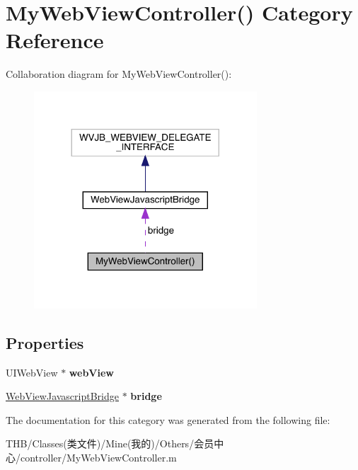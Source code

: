 \hypertarget{category_my_web_view_controller_07_08}{}\section{My\+Web\+View\+Controller() Category Reference}
\label{category_my_web_view_controller_07_08}


Collaboration diagram for My\+Web\+View\+Controller()\+:\nopagebreak
\begin{figure}[H]
\begin{center}
\leavevmode
\includegraphics[width=236pt]{category_my_web_view_controller_07_08__coll__graph}
\end{center}
\end{figure}
\subsection*{Properties}
\begin{DoxyCompactItemize}
\item 
\mbox{\label{category_my_web_view_controller_07_08_a2c760869315008e0c78f24890d1a091e}} 
U\+I\+Web\+View $\ast$ {\bfseries web\+View}
\item 
\mbox{\label{category_my_web_view_controller_07_08_a71167b834f1fdc8f49983fbffb69c965}} 
\mbox{\hyperlink{interface_web_view_javascript_bridge}{Web\+View\+Javascript\+Bridge}} $\ast$ {\bfseries bridge}
\end{DoxyCompactItemize}


The documentation for this category was generated from the following file\+:\begin{DoxyCompactItemize}
\item 
T\+H\+B/\+Classes(类文件)/\+Mine(我的)/\+Others/会员中心/controller/My\+Web\+View\+Controller.\+m\end{DoxyCompactItemize}
